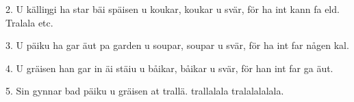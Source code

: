 2. U källiŋgi ha star bäi späisen u koukar,
   koukar u svär, för ha int kann fa eld.
   Tralala etc.

3. U päiku ha gar äut pa garden u soupar,
   soupar u svär, för ha int far någen kal.

4. U gräisen han gar in äi stäiu u båikar,
   båikar u svär, för han int far ga äut.

5. Sin gynnar bad päiku u gräisen at trallä.
   trallalala tralalalalala.
